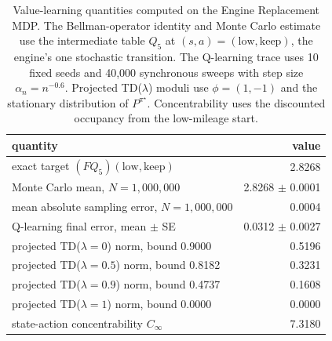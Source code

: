 \begin{table}[h]
\centering
\caption{Value-learning quantities computed on the Engine Replacement MDP. The Bellman-operator identity and Monte Carlo estimate use the intermediate table $Q_{5}$ at $(s,a) = (\text{low}, \text{keep})$, the engine's one stochastic transition. The Q-learning trace uses 10 fixed seeds and 40,000 synchronous sweeps with step size $\alpha_n = n^{-0.6}$. Projected TD($\lambda$) moduli use $\phi=(1,-1)$ and the stationary distribution of $P^{\pi^\star}$. Concentrability uses the discounted occupancy from the low-mileage start.}
\label{tab:engine_value_learning}
\begin{tabular}{p{}r}
\hline
quantity & value \\
\hline
exact target $(FQ_5)(\text{low},\text{keep})$ & 2.8268 \\
Monte Carlo mean, $N = 1,000,000$ & 2.8268 $\pm$ 0.0001 \\
mean absolute sampling error, $N = 1,000,000$ & 0.0004 \\
Q-learning final error, mean $\pm$ SE & 0.0312 $\pm$ 0.0027 \\
projected TD($\lambda=0$) norm, bound 0.9000 & 0.5196 \\
projected TD($\lambda=0.5$) norm, bound 0.8182 & 0.3231 \\
projected TD($\lambda=0.9$) norm, bound 0.4737 & 0.1608 \\
projected TD($\lambda=1$) norm, bound 0.0000 & 0.0000 \\
state-action concentrability $C_\infty$ & 7.3180 \\
\hline
\end{tabular}
\end{table}
